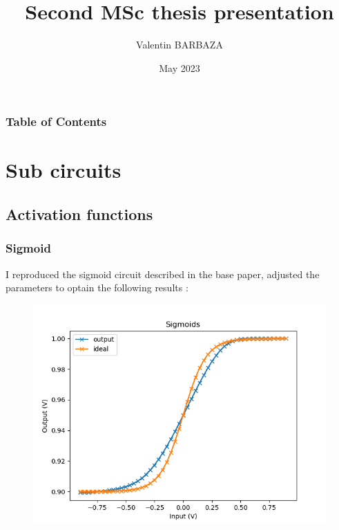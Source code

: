\documentclass{beamer}
\title[MSc Thesis 2]
{Second MSc thesis presentation}
\author[V. BARBAZA]{Valentin BARBAZA}
\date[2023] %
{May 2023}
\begin{document}
\frame{\titlepage}

\begin{frame}
\frametitle{Table of Contents}
\tableofcontents
\end{frame}

\section{Sub circuits}
\subsection{Activation functions}

\begin{frame}
\frametitle{Sigmoid}
I reproduced the sigmoid circuit described in the base paper, adjusted the parameters to optain the following results :
\begin{figure}
    \centering
      \includegraphics[height=0.5\textheight]{figures/sigmoid.png}
\end{figure}
\end{frame}
\end{document}
